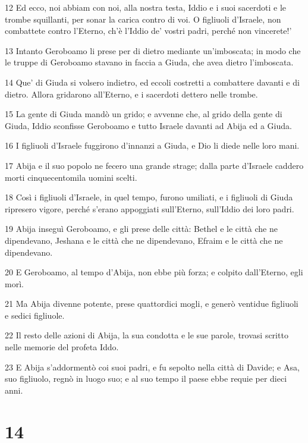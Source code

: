 \par 12 Ed ecco, noi abbiam con noi, alla nostra testa, Iddio e i suoi sacerdoti e le trombe squillanti, per sonar la carica contro di voi. O figliuoli d'Israele, non combattete contro l'Eterno, ch'è l'Iddio de' vostri padri, perché non vincerete!'
\par 13 Intanto Geroboamo li prese per di dietro mediante un'imboscata; in modo che le truppe di Geroboamo stavano in faccia a Giuda, che avea dietro l'imboscata.
\par 14 Que' di Giuda si volsero indietro, ed eccoli costretti a combattere davanti e di dietro. Allora gridarono all'Eterno, e i sacerdoti dettero nelle trombe.
\par 15 La gente di Giuda mandò un grido; e avvenne che, al grido della gente di Giuda, Iddio sconfisse Geroboamo e tutto Israele davanti ad Abija ed a Giuda.
\par 16 I figliuoli d'Israele fuggirono d'innanzi a Giuda, e Dio li diede nelle loro mani.
\par 17 Abija e il suo popolo ne fecero una grande strage; dalla parte d'Israele caddero morti cinquecentomila uomini scelti.
\par 18 Così i figliuoli d'Israele, in quel tempo, furono umiliati, e i figliuoli di Giuda ripresero vigore, perché s'erano appoggiati sull'Eterno, sull'Iddio dei loro padri.
\par 19 Abija inseguì Geroboamo, e gli prese delle città: Bethel e le città che ne dipendevano, Jeshana e le città che ne dipendevano, Efraim e le città che ne dipendevano.
\par 20 E Geroboamo, al tempo d'Abija, non ebbe più forza; e colpito dall'Eterno, egli morì.
\par 21 Ma Abija divenne potente, prese quattordici mogli, e generò ventidue figliuoli e sedici figliuole.
\par 22 Il resto delle azioni di Abija, la sua condotta e le sue parole, trovasi scritto nelle memorie del profeta Iddo.
\par 23 E Abija s'addormentò coi suoi padri, e fu sepolto nella città di Davide; e Asa, suo figliuolo, regnò in luogo suo; e al suo tempo il paese ebbe requie per dieci anni.

\chapter{14}


